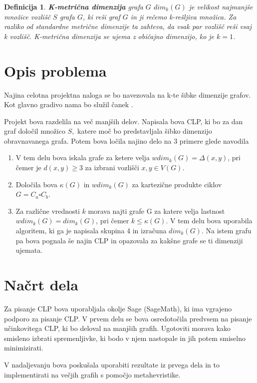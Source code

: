 \documentclass[a4paper,12pt]{article}
\newtheorem{definition}{Definicija}
\begin{document}
    \begin{definition}
        {\bf K-metrična dimenzija} grafa $G$ $dim_k(G)$ je velikost najmanjše množice vozlišč $S$ grafa $G$, ki reši graf $G$ in ji rečemo k-rešljiva množica. 
        Za razliko od standardne metrične dimenzije ta zahteva, da vsak par vozlišč reši vsaj k vozlišč. K-metrična dimenzija se ujema z običajno dimenzijo, ko je $k = 1$.
    \end{definition}
\section{Opis problema} 
Najina celotna projektna naloga se bo navezovala na k-te šibke dimenzije grafov. Kot glavno gradivo nama bo služil čanek \cite{peterin2023resolving}.

Projekt bova razdelila na več manjših delov. Napisala bova CLP, ki bo za dan graf določil množico $S,$ katere moč bo predstavljala šibko dimenzijo obravnavanega grafa. Potem bova ločila najino delo na 3 primere glede navodila

\begin{enumerate}
    \item V tem delu bova iskala grafe za ketere velja $wdim_k(G) = \Delta (x,y)$, pri čemer je $d(x,y) \geq 3$ za izbrani vozlišči $x, y \in V(G)$.

    \item Določila bova $\kappa(G)$ in $wdim_k(G)$ za kartezične produkte ciklov $G = C_a \square C_b$.
    
    \item Za različne vrednosti $k$ morava najti grafe G za katere velja lastnost $wdim_k(G) = dim_k(G)$, pri čemer $k \leq \kappa(G)$. V tem delu bova uporabila algoritem, ki ga je napisala skupina 4 in izračuna $dim_k(G).$ Na istem grafu pa bova pognala še najin CLP in opazovala za kakšne grafe se ti dimenziji ujemata.
\end{enumerate}

\section{Načrt dela}
Za pisanje CLP bova uporabljala okolje Sage (SageMath), ki ima vgrajeno podporo za pisanje CLP. V prvem delu se bova osredotočila predvsem na pisanje učinkovitega CLP, ki bo deloval na manjših grafih. Ugotoviti morava kako smisleno izbrati spremenljivke, ki bodo v njem nastopale in jih potem smiselno minimizirati. 

V nadaljevanju bova poskušala uporabiti rezultate iz prvega dela in to implementirati na večjih grafih s pomočjo metahevristike.
\end{document}
